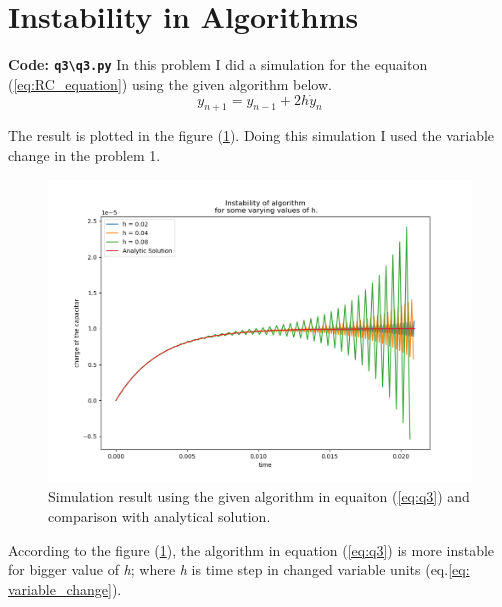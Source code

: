 \documentclass[12pt, a4paper]{article}
\begin{document}
	\section{Instability in Algorithms}
	\textbf{Code: \texttt{q3\textbackslash q3.py}}
	\newline
	In this problem I did a simulation for the equaiton (\ref{eq:RC_equation}) using the given 
	algorithm below. \\
		\begin{equation}
			y_{n+1} = y_{n-1} + 2h\dot{y}_{n}
			\label{eq:q3}
		\end{equation}
	
    The result is plotted in the figure (\ref{fig:q3}).
	Doing this simulation I used the variable change in the problem 1.
		\begin{figure}[h]
			\centering
			\includegraphics[width=0.8\linewidth]{../q3/q3.png}
			\caption{Simulation result using the given algorithm in equaiton (\ref{eq:q3}) and comparison with
			analytical solution.}
			\label{fig:q3}
		\end{figure}
	According to the figure (\ref{fig:q3}), the algorithm in equation (\ref{eq:q3})
	is more instable for bigger value of \textit{h}; where \textit{h} is time step in changed
	variable units (eq.\ref{eq: variable_change}).
\end{document}
